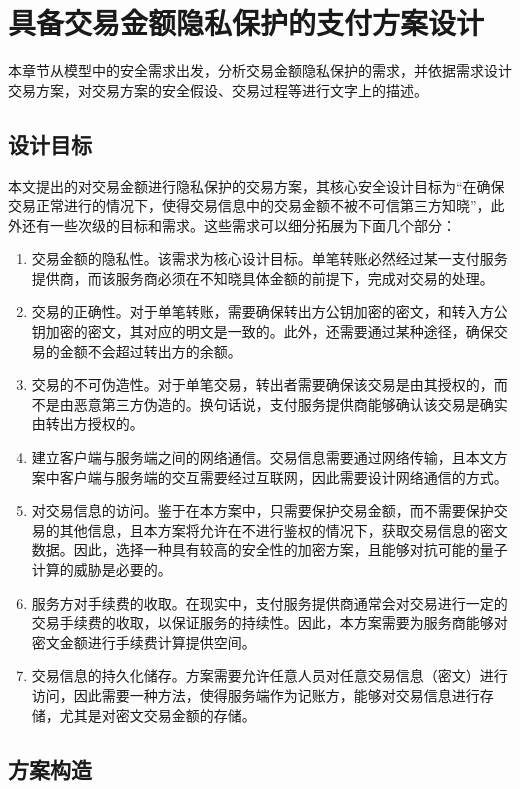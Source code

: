 \chapter{具备交易金额隐私保护的支付方案设计}

本章节从模型中的安全需求出发，分析交易金额隐私保护的需求，并依据需求设计交易方案，对交易方案的安全假设、交易过程等进行文字上的描述。

\section{设计目标}

本文提出的对交易金额进行隐私保护的交易方案，其核心安全设计目标为“在确保交易正常进行的情况下，使得交易信息中的交易金额不被不可信第三方知晓”，此外还有一些次级的目标和需求。这些需求可以细分拓展为下面几个部分：

\begin{enumerate} %
    \item 交易金额的隐私性。该需求为核心设计目标。单笔转账必然经过某一支付服务提供商，而该服务商必须在不知晓具体金额的前提下，完成对交易的处理。
    \item 交易的正确性。对于单笔转账，需要确保转出方公钥加密的密文，和转入方公钥加密的密文，其对应的明文是一致的。此外，还需要通过某种途径，确保交易的金额不会超过转出方的余额。
    \item 交易的不可伪造性。对于单笔交易，转出者需要确保该交易是由其授权的，而不是由恶意第三方伪造的。换句话说，支付服务提供商能够确认该交易是确实由转出方授权的。
    \item 建立客户端与服务端之间的网络通信。交易信息需要通过网络传输，且本文方案中客户端与服务端的交互需要经过互联网，因此需要设计网络通信的方式。
    \item 对交易信息的访问。鉴于在本方案中，只需要保护交易金额，而不需要保护交易的其他信息，且本方案将允许在不进行鉴权的情况下，获取交易信息的密文数据。因此，选择一种具有较高的安全性的加密方案，且能够对抗可能的量子计算的威胁是必要的。
    \item 服务方对手续费的收取。在现实中，支付服务提供商通常会对交易进行一定的交易手续费的收取，以保证服务的持续性。因此，本方案需要为服务商能够对密文金额进行手续费计算提供空间。
    \item 交易信息的持久化储存。方案需要允许任意人员对任意交易信息（密文）进行访问，因此需要一种方法，使得服务端作为记账方，能够对交易信息进行存储，尤其是对密文交易金额的存储。
\end{enumerate}

\section{方案构造}

